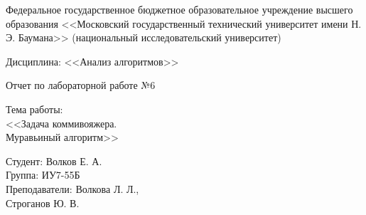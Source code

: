 \documentclass[a4paper,12pt]{article}
\begin{document}


\large
\begin{center}
Федеральное государственное бюджетное образовательное учреждение 
высшего образования <<Московский государственный технический 
университет имени Н. Э. Баумана>> 
(национальный исследовательский университет)
\end{center}

\vspace*{30mm} 

\LARGE
\begin{center}
Дисциплина: <<Анализ алгоритмов>>

Отчет по лабораторной работе №6
\end{center}

\vspace*{30mm} 

\huge
\begin{center}
Тема работы:\\
<<Задача коммивояжера.\\ Муравьиный алгоритм>>
\end{center}
\vspace*{30mm} 

\large
\begin{flushright}
Студент: Волков Е. А. \\
Группа: ИУ7-55Б \\
Преподаватели: Волкова Л. Л., \\ Строганов Ю. В. \\
\end{flushright}
\end{document}
